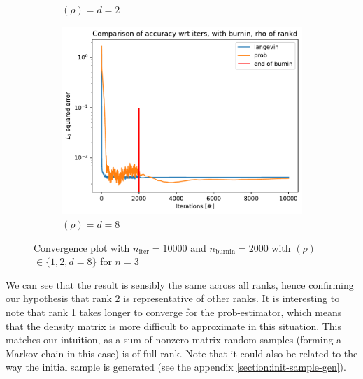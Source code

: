 \documentclass[12pt]{memoir}
\newcommand{\nitern}[1]{$n_{\text{iter}}=#1$}
\newcommand{\nburninn}[1]{$n_{\text{burnin}}=#1$}
\newcommand{\rhorankn}[1]{\text{rank}$(\rho)=#1$}
\newcommand{\rhorank}[0]{\text{rank}$(\rho) $ }
\begin{document}
\begin{figure}[H]
\begin{subfigure}[b]{0.49\textwidth}
        \caption{\rhorankn{d=2}}

        \label{fig:conv-plot-diff-rank-2-sub}

    \end{subfigure}

    \begin{subfigure}[b]{0.49\textwidth}


        \centering

        \includegraphics[width=\textwidth]{figures/experiments/baseline/diff_rank/iters_acc_comp_iters_no_avg_rankd-1.png}

        \caption{\rhorankn{d=8}}

        \label{fig:conv-plot-diff-rank-d-sub}

    \end{subfigure}

    \caption{Convergence plot with \nitern{10000} and \nburninn{2000} with \rhorank $\in \{1,2,d=8\}$ for $n=3$  }

    \label{fig:conv-plot-diff-rank}

\end{figure}


We can see that the result is sensibly the same across all ranks, hence confirming our hypothesis that rank 2 is representative of other ranks. It is interesting to note that rank 1 takes longer to converge for the prob-estimator, which means that the density matrix is more difficult to approximate in this situation. This matches our intuition, as a sum of nonzero matrix random samples (forming a Markov chain in this case) is of full rank. Note that it could also be related to the way the initial sample is generated (see the appendix \ref{section:init-sample-gen}).
\end{document}
